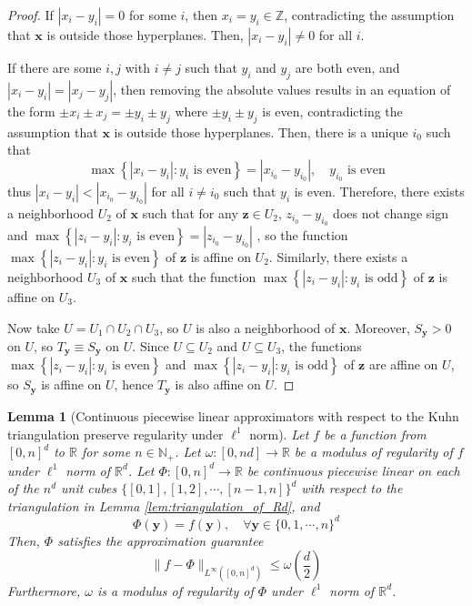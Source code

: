 \documentclass{article}
\numberwithin{equation}{section}
\newtheorem{lemma}{Lemma}[section]
\theoremstyle{definition}
\begin{document}
\begin{proof}
If $| x_i - y_i | = 0$ for some $i$, then $x_i=y_i\in\mathbb{Z}$, contradicting the assumption that $\mathbf{x}$ is outside those hyperplanes. Then, $| x_i - y_i | \ne 0$ for all $i$.

If there are some $i,j$ with $i\ne j$ such that $y_i$ and $y_j$ are both even, and $|x_i-y_i| = |x_j-y_j|$, then removing the absolute values results in an equation of the form $\pm x_i \pm x_j = \pm y_i \pm y_j$ where $\pm y_i \pm y_j$ is even, contradicting the assumption that $\mathbf{x}$ is outside those hyperplanes. Then, there is a unique $i_0$ such that 
$$\max
\left\{
    | x_i - y_i | :
    y_i \text{ is even}
\right\}
= 
| x_{i_0} - y_{i_0} |, \quad
y_{i_0} \text{ is even}$$
thus $|x_i-y_i| < | x_{i_0} - y_{i_0} |$ for all $i\ne i_0$ such that $y_i$ is even. Therefore, there exists a neighborhood $U_2$ of $\mathbf{x}$ such that for any $\mathbf{z}\in U_2$, $z_{i_0}-y_{i_0}$ does not change sign and 
$\max
\left\{
    | z_i - y_i | :
    y_i \text{ is even}
\right\}
= 
| z_{i_0} - y_{i_0} |$
, so the function 
$\max
\left\{
    | z_i - y_i | :
    y_i \text{ is even}
\right\}$ 
of $\mathbf{z}$ is affine on $U_2$. Similarly, there exists a neighborhood $U_3$ of $\mathbf{x}$ such that the function 
$\max
\left\{
    | z_i - y_i | :
    y_i \text{ is odd}
\right\}$ 
of $\mathbf{z}$ is affine on $U_3$.

Now take $U = U_1 \cap U_2 \cap U_3$, so $U$ is also a neighborhood of $\mathbf{x}$. Moreover, $S_{\mathbf{y}}>0$ on $U$, so $T_{\mathbf{y}}\equiv S_{\mathbf{y}}$ on $U$. Since $U\subseteq U_2$ and $U\subseteq U_3$, the functions 
$\max
\left\{
    | z_i - y_i | :
    y_i \text{ is even}
\right\}$ 
and
$\max
\left\{
    | z_i - y_i | :
    y_i \text{ is odd}
\right\}$ 
of $\mathbf{z}$ are affine on $U$, so $S_{\mathbf{y}}$ is affine on $U$, hence $T_{\mathbf{y}}$ is also affine on $U$.
\end{proof}


\begin{lemma}[Continuous piecewise linear approximators with respect to the Kuhn triangulation preserve regularity under $\ell^1$ norm]
\label{lem:CPWLApprox_wRegControl}
    Let $f$ be a function from $[0,n]^d$ to $\mathbb{R}$ for some $n\in\mathbb{N}_+$. Let $\omega:[0,nd]\rightarrow\mathbb{R}$ be a modulus of regularity of $f$ under $\ell^1$ norm of $\mathbb{R}^d$. Let $\Phi:[0,n]^d\rightarrow\mathbb{R}$ be continuous piecewise linear on each of the $n^d$ unit cubes $\{[0,1],[1,2],\cdots,[n-1,n]\}^d$ with respect to the triangulation in Lemma \ref{lem:triangulation_of_Rd}, and
    $$\Phi(\mathbf{y}) = f(\mathbf{y}), \quad
    \forall \mathbf{y} \in\{0,1,\cdots,n\}^d$$
    Then, $\Phi$ satisfies the approximation guarantee
    $$\| f-\Phi \|_{L^{\infty}([0,n]^d)} \le 
    \omega \left( \frac{d}{2} \right)$$
    Furthermore, $\omega$ is a modulus of regularity of $\Phi$ under $\ell^1$ norm of $\mathbb{R}^d$.
\end{lemma}
\end{document}
